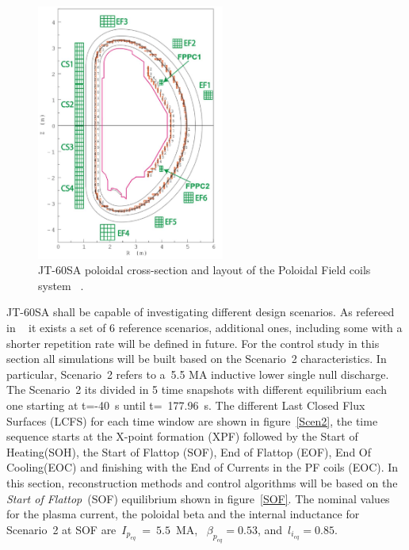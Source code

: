 \begin{figure}
	\centering
	\includegraphics[width=0.55\textwidth]{Chp3/JT60Coils.png}

	\caption{	\label{JT60coils}JT-60SA poloidal cross-section and layout of the Poloidal Field coils system ~\cite{NCruz}.}
\end{figure}

JT-60SA shall be capable of investigating different design scenarios. As refereed  in 
~\cite{JT60SA:PID} it exists a set of 6 reference scenarios, additional ones, including some with a shorter repetition rate will be defined in future. For the control study in this section all simulations will be built based on the Scenario~2 characteristics. In particular, Scenario~2 refers to a~5.5 MA inductive lower single null discharge. The Scenario~2 its divided in 5 time snapshots with different equilibrium each one starting at  t=-40~s until t=~177.96~s. The different Last Closed Flux Surfaces (LCFS) for each time window are shown in figure~\ref{Scen2}, the time sequence starts at the X-point formation (XPF)	followed by the Start of Heating(SOH), the Start of Flattop (SOF), End of Flattop (EOF), End Of Cooling(EOC) and finishing with the End of Currents in the PF coils (EOC). In this section, reconstruction methods and control algorithms will be based on the \emph{Start of Flattop}~(SOF) equilibrium shown in figure~\ref{SOF}. The nominal values for the plasma current, the poloidal beta and the internal inductance for Scenario~2 at SOF are~$I_{p_{eq}}~=~5.5$~MA,~ $\beta_{p_{eq}}=0.53$, and~$l_{i_{eq}}=0.85$.\smallskip

